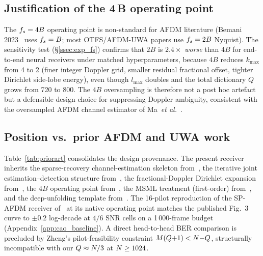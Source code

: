 \subsection{Justification of the 4\,B operating point}
\label{ssec:disc_oversampling}
The $f_s=4B$ operating point is non-standard for AFDM literature
(Bemani 2023~\cite{bemani2023afdm} uses $f_s=B$; most OTFS/AFDM-UWA
papers use $f_s=2B$ Nyquist). The sensitivity test
(\S\ref{ssec:exp_fs}) confirms that $2B$ is $2.4\times$ \emph{worse}
than $4B$ for end-to-end neural receivers under matched hyperparameters,
because $4B$ reduces $k_{\max}$ from 4 to 2 (finer integer Doppler grid,
smaller residual fractional offset, tighter Dirichlet side-lobe energy),
even though $l_{\max}$ doubles and the total dictionary $Q$ grows from
720 to 800. The $4B$ oversampling is therefore not a post hoc
artefact but a defensible design choice for suppressing Doppler ambiguity,
consistent with the oversampled AFDM channel estimator of
Ma~\emph{et al.}~\cite{ma2024oversampledafdm}.

\subsection{Position vs.\ prior AFDM and UWA work}
\label{ssec:disc_priorart}

Table~\ref{tab:priorart} consolidates the design provenance. The
present receiver inherits the sparse-recovery channel-estimation
skeleton from~\cite{benzine2023sparseafdm}, the iterative joint
estimation--detection structure from~\cite{qing2024spafdm,zhao2024gifreeafdm},
the fractional-Doppler Dirichlet expansion from~\cite{yin2024drceafdm},
the $4B$ operating point from~\cite{ma2024oversampledafdm}, the MSML
treatment (first-order) from~\cite{zhou2024msmlafdm}, and the
deep-unfolding template from~\cite{monga2021unrolling,gregor2010lista,borgerding2017amp}.
The 16-pilot reproduction of the SP-AFDM receiver
of~\cite{qing2024spafdm} at its native operating point
matches the published Fig.~3 curve to $\pm 0.2$ log-decade at $4/6$ SNR
cells on a 1\,000-frame budget (Appendix~\ref{app:cao_baseline}). A
direct head-to-head BER comparison is precluded by Zheng's pilot-feasibility
constraint $M(Q{+}1)<N{-}Q$, structurally incompatible with our
$Q\approx N/3$ at $N\geq 1024$.

